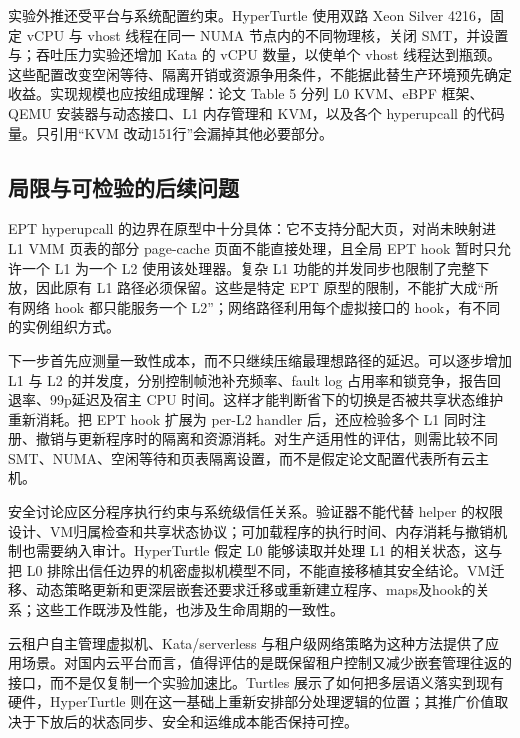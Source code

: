 实验外推还受平台与系统配置约束。HyperTurtle 使用双路 Xeon Silver 4216，固定 vCPU 与 vhost 线程在同一 NUMA 节点内的不同物理核，关闭 SMT，并设置与；吞吐压力实验还增加 Kata 的 vCPU 数量，以使单个 vhost 线程达到瓶颈\cite[\S5, Table 6]{source8}。这些配置改变空闲等待、隔离开销或资源争用条件，不能据此替生产环境预先确定收益。实现规模也应按组成理解：论文 Table 5 分列 L0 KVM、eBPF 框架、QEMU 安装器与动态接口、L1 内存管理和 KVM，以及各个 hyperupcall 的代码量。只引用“KVM 改动151行”会漏掉其他必要部分\cite[\S4.6]{source8}。

\subsection{局限与可检验的后续问题}\label{sec:nested-open}

EPT hyperupcall 的边界在原型中十分具体：它不支持分配大页，对尚未映射进 L1 VMM 页表的部分 page-cache 页面不能直接处理，且全局 EPT hook 暂时只允许一个 L1 为一个 L2 使用该处理器。复杂 L1 功能的并发同步也限制了完整下放，因此原有 L1 路径必须保留\cite[\S4.8]{source8}。这些是特定 EPT 原型的限制，不能扩大成“所有网络 hook 都只能服务一个 L2”；网络路径利用每个虚拟接口的 hook，有不同的实例组织方式。

下一步首先应测量一致性成本，而不只继续压缩最理想路径的延迟。可以逐步增加 L1 与 L2 的并发度，分别控制帧池补充频率、fault log 占用率和锁竞争，报告回退率、99p延迟及宿主 CPU 时间。这样才能判断省下的切换是否被共享状态维护重新消耗。把 EPT hook 扩展为 per-L2 handler 后，还应检验多个 L1 同时注册、撤销与更新程序时的隔离和资源消耗。对生产适用性的评估，则需比较不同 SMT、NUMA、空闲等待和页表隔离设置，而不是假定论文配置代表所有云主机。

安全讨论应区分程序执行约束与系统级信任关系。验证器不能代替 helper 的权限设计、VM归属检查和共享状态协议；可加载程序的执行时间、内存消耗与撤销机制也需要纳入审计。HyperTurtle 假定 L0 能够读取并处理 L1 的相关状态，这与把 L0 排除出信任边界的机密虚拟机模型不同，不能直接移植其安全结论。VM迁移、动态策略更新和更深层嵌套还要求迁移或重新建立程序、maps及hook的关系；这些工作既涉及性能，也涉及生命周期的一致性。

云租户自主管理虚拟机、Kata/serverless 与租户级网络策略为这种方法提供了应用场景。对国内云平台而言，值得评估的是既保留租户控制又减少嵌套管理往返的接口，而不是仅复制一个实验加速比。Turtles 展示了如何把多层语义落实到现有硬件，HyperTurtle 则在这一基础上重新安排部分处理逻辑的位置；其推广价值取决于下放后的状态同步、安全和运维成本能否保持可控。

